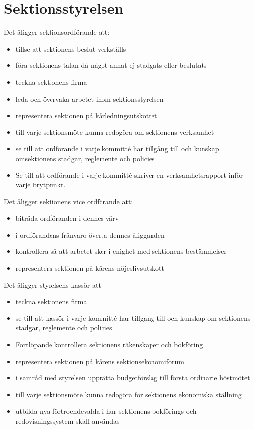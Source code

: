 \documentclass[a4paper]{dtek}
\begin{document}
\section{Sektionsstyrelsen}
\para Det åligger sektionsordförande att:
\begin{itemize}
  \item tillse att sektionens beslut verkställs
  \item föra sektionens talan då något annat ej stadgats eller beslutats
  \item teckna sektionens firma
  \item leda och övervaka arbetet inom sektionsstyrelsen
  \item representera sektionen på kårledningsutskottet
  \item till varje sektionsmöte kunna redogöra om sektionens verksamhet
  \item se till att ordförande i varje kommitté har tillgång till och kunskap omsektionens stadgar, reglemente och policies
  \item Se till att ordförande i varje kommitté skriver en verksamhetsrapport inför varje brytpunkt.
\end{itemize}
\para Det åligger sektionens vice ordförande att:
\begin{itemize}
  \item biträda ordföranden i dennes värv
  \item i ordförandens frånvaro överta dennes åligganden
  \item kontrollera så att arbetet sker i enighet med sektionens bestämmelser
  \item representera sektionen på kårens nöjeslivsutskott
\end{itemize}
\para Det åligger styrelsens kassör att:
\begin{itemize}
  \item teckna sektionens firma
  \item se till att kassör i varje kommitté har tillgång till och kunskap om sektionens stadgar, reglemente och policies
  \item Fortlöpande kontrollera sektionens räkenskaper och bokföring
  \item representera sektionen på kårens sektionsekonomiforum
  \item i samråd med styrelsen upprätta budgetförslag till första ordinarie höstmötet
  \item till varje sektionsmöte kunna redogöra för sektionens ekonomiska ställning
  \item utbilda nya förtroendevalda i hur sektionens bokförings och redovisningssystem skall användas
\end{itemize}
\end{document}
